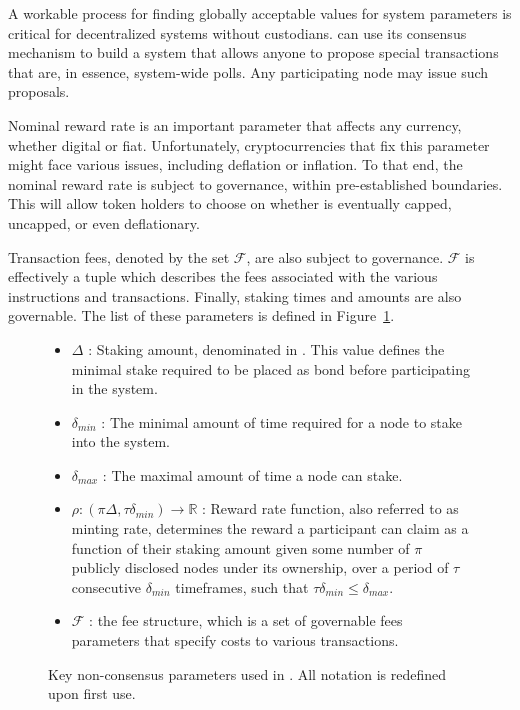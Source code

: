 \documentclass[runningheads]{llncs}
\begin{document}

A workable process for finding globally acceptable values for system parameters is critical for decentralized systems without custodians. 
\AVAPlatformName{} can use its consensus mechanism to build a system that allows anyone to propose special transactions that are, in essence, system-wide polls. 
Any participating node may issue such proposals. 

Nominal reward rate is an important parameter that affects any currency, whether digital or fiat. 
Unfortunately, cryptocurrencies that fix this parameter might face various issues, including deflation or inflation.
To that end, the nominal reward rate is subject to governance, within pre-established boundaries. This will allow token holders to choose on whether \AVATokenName{} is eventually capped, uncapped, or even deflationary. 

Transaction fees, denoted by the set $\mathcal{F}$, are also subject to governance. 
$\mathcal{F}$ is effectively a tuple which describes the fees associated with the various instructions and transactions. 
Finally, staking times and amounts are also governable. 
The list of these parameters is defined in Figure~\ref{fig:notation}.

\begin{figure}[hbtp]
\begin{framed}
\begin{itemize}
\item{$\Delta$} : Staking amount, denominated in \AVATokenName{}. This value defines the minimal stake required to be placed as bond before participating in the system.
\item{$\delta_{min}$} : The minimal amount of time required for a node to stake into the system.
\item{$\delta_{max}$} : The maximal amount of time a node can stake.
\item{$\rho: (\pi\Delta,\tau\delta_{min}) \rightarrow \mathbb{R}$} : Reward rate function, also referred to as minting rate, determines the reward a participant can claim as a function of their staking amount given some number of $\pi$ publicly disclosed nodes under its ownership, over a period of $\tau$ consecutive $\delta_{min}$ timeframes, such that $\tau\delta_{min} \leq \delta_{max}$. 
\item{$\mathcal{F}$} : the fee structure, which is a set of governable fees parameters that specify costs to various transactions.
\end{itemize}
\end{framed}
\caption{Key non-consensus parameters used in \AVAPlatformName{}. All notation is redefined upon first use.}
\label{fig:notation}
\end{figure}
\end{document}
